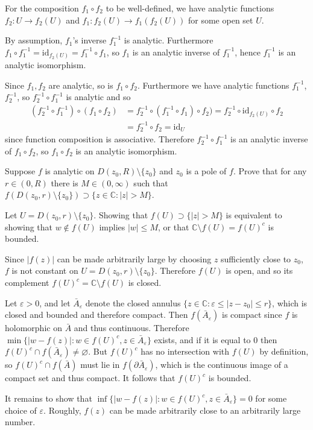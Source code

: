 \documentclass{article}
\newcommand\id{\mathrm{id}}
\newcounter{Problem}
\newenvironment{Problem}{\begin{Exercise}[name={Problem},
                                          counter={Problem}]}
                        {\end{Exercise}}
\begin{document}
\begin{Answer}
For the composition $f_1 \circ f_2$ to be well-defined,
we have analytic functions $f_2 : U \to f_2(U)$ and
$f_1 : f_2(U) \to f_1(f_2(U))$ for some open set $U$.

By assumption, $f_1$'s inverse $f_1^{-1}$ is analytic.
Furthermore $f_1 \circ f_1^{-1} = \id_{f_2(U)} = f_1^{-1} \circ f_1$,
so $f_1$ is an analytic inverse of $f_1^{-1}$, hence
$f_1^{-1}$ is an analytic isomorphism.

Since $f_1, f_2$ are analytic, so is $f_1 \circ f_2$.
Furthermore we have analytic functions $f_1^{-1}$, $f_2^{-1}$,
so $f_2^{-1} \circ f_1^{-1}$ is analytic and so
\begin{align*}
  (f_2^{-1} \circ f_1^{-1}) \circ (f_1 \circ f_2)
&= f_2^{-1} \circ (f_1^{-1} \circ f_1) \circ f_2)
 = f_2^{-1} \circ \id_{f_2(U)} \circ f_2 \\
&= f_2^{-1} \circ f_2
 = \id_U
\end{align*}
since function composition is associative. Therefore
$f_2^{-1} \circ f_1^{-1}$ is an analytic inverse of $f_1 \circ f_2$,
so $f_1 \circ f_2$ is an analytic isomorphism.
\end{Answer}

\begin{Problem}
Suppose $f$ is analytic on $D(z_0, R) \setminus \{ z_0 \}$
and $z_0$ is a pole of $f$. Prove that for any $r \in (0, R)$
there is $M \in (0, \infty)$ such that
$f(D(z_0, r) \setminus \{z_0\})
 \supset
 \{ z \in \mathbb{C} : |z| > M \}$.
\end{Problem}

\begin{Answer}
Let $U = D(z_0, r) \setminus \{ z_0 \}$.
Showing that
$f(U) \supset \{ |z| > M \}$
is equivalent to showing that
$w \notin f(U)$ implies
$|w| \leq M$, or that
$\mathbb{C} \setminus f(U) = f(U)^c$ is bounded.

Since $|f(z)|$ can be made arbitrarily large by choosing
$z$ sufficiently close to $z_0$, $f$ is not constant on
$U = D(z_0, r) \setminus \{ z_0 \}$. Therefore $f(U)$ is open,
and so its complement $f(U)^c = \mathbb{C} \setminus f(U)$ is closed.

Let $\varepsilon > 0$, and let $\bar{A}_\varepsilon$ denote the closed annulus
$\{ z \in \mathbb{C} : \varepsilon \leq |z - z_0| \leq r \}$, which is closed and
bounded and therefore compact. Then $f(\bar{A}_\varepsilon)$ is compact since $f$
is holomorphic on $\bar{A}$ and thus continuous. Therefore
$\min \{ |w - f(z)| : w \in f(U)^c, z \in \bar{A}_\varepsilon \}$ exists, and if
it is equal to 0 then $f(U)^c \cap f(\bar{A}_\varepsilon) \neq \varnothing$. But
$f(U)^c$ has no intersection with $f(U)$ by definition, so
$f(U)^c \cap f(\bar{A})$ must lie in $f(\partial \bar{A}_\varepsilon)$, which is
the continuous image of a compact set and thus compact. It follows
that $f(U)^c$ is bounded.

It remains to show that
$\inf \{ |w - f(z)| : w \in f(U)^c, z \in \bar{A}_\varepsilon \} = 0$
for some choice of $\varepsilon$. Roughly,
$f(z)$ can be made arbitrarily close to an arbitrarily large number.
\end{Answer}
\end{document}
